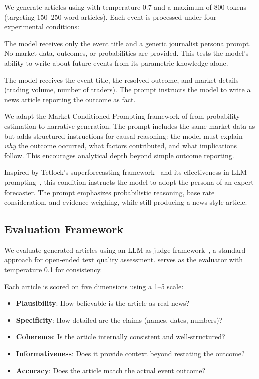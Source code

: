 We generate articles using \gptfour with temperature 0.7 and a maximum of 800 tokens (targeting 150--250 word articles). Each event is processed under four experimental conditions:

 The model receives only the event title and a generic journalist persona prompt. No market data, outcomes, or probabilities are provided. This tests the model's ability to write about future events from its parametric knowledge alone.

 The model receives the event title, the resolved outcome, and market details (trading volume, number of traders). The prompt instructs the model to write a news article reporting the outcome as fact.

 We adapt the Market-Conditioned Prompting framework of \citet{mentionmarkets2026} from probability estimation to narrative generation. The prompt includes the same market data as \directmarket but adds structured instructions for causal reasoning: the model must explain \emph{why} the outcome occurred, what factors contributed, and what implications follow. This encourages analytical depth beyond simple outcome reporting.

 Inspired by Tetlock's superforecasting framework~\citep{tetlock2015superforecasting} and its effectiveness in LLM prompting~\citep{aiaugmented2024, promptforecasting2025}, this condition instructs the model to adopt the persona of an expert forecaster. The prompt emphasizes probabilistic reasoning, base rate consideration, and evidence weighing, while still producing a news-style article.

\subsection{Evaluation Framework}
\label{sec:evaluation}

We evaluate generated articles using an LLM-as-judge framework~\citep{zheng2024judging}, a standard approach for open-ended text quality assessment. \gptfour serves as the evaluator with temperature 0.1 for consistency.

 Each article is scored on five dimensions using a 1--5 scale:
\begin{itemize}[leftmargin=*,itemsep=0pt,topsep=0pt]
    \item \textbf{Plausibility}: How believable is the article as real news?
    \item \textbf{Specificity}: How detailed are the claims (names, dates, numbers)?
    \item \textbf{Coherence}: Is the article internally consistent and well-structured?
    \item \textbf{Informativeness}: Does it provide context beyond restating the outcome?
    \item \textbf{Accuracy}: Does the article match the actual event outcome?
\end{itemize}

